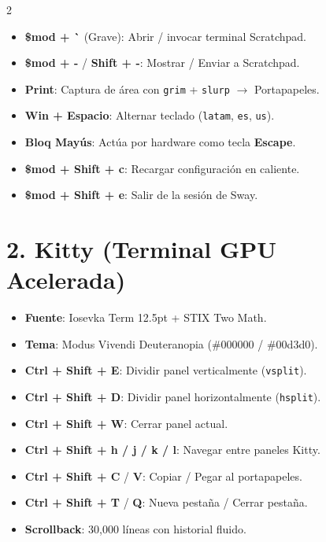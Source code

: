 \documentclass[article,spanish]{apuntes-scr}
\begin{document}
\begin{multicols*}{2}
\begin{itemize}[leftmargin=*]
    \item \textbf{\$mod + \`{}} (Grave): Abrir / invocar terminal Scratchpad.
    \item \textbf{\$mod + -} / \textbf{Shift + -}: Mostrar / Enviar a Scratchpad.
    \item \textbf{Print}: Captura de área con \texttt{grim} + \texttt{slurp} $\to$ Portapapeles.
    \item \textbf{Win + Espacio}: Alternar teclado (\texttt{latam}, \texttt{es}, \texttt{us}).
    \item \textbf{Bloq Mayús}: Actúa por hardware como tecla \textbf{Escape}.
    \item \textbf{\$mod + Shift + c}: Recargar configuración en caliente.
    \item \textbf{\$mod + Shift + e}: Salir de la sesión de Sway.
  \end{itemize}

  \section*{2. Kitty (Terminal GPU Acelerada)}
  \begin{itemize}[leftmargin=*]
    \item \textbf{Fuente}: Iosevka Term 12.5pt + STIX Two Math.
    \item \textbf{Tema}: Modus Vivendi Deuteranopia (\#000000 / \#00d3d0).
    \item \textbf{Ctrl + Shift + E}: Dividir panel verticalmente (\texttt{vsplit}).
    \item \textbf{Ctrl + Shift + D}: Dividir panel horizontalmente (\texttt{hsplit}).
    \item \textbf{Ctrl + Shift + W}: Cerrar panel actual.
    \item \textbf{Ctrl + Shift + h / j / k / l}: Navegar entre paneles Kitty.
    \item \textbf{Ctrl + Shift + C} / \textbf{V}: Copiar / Pegar al portapapeles.
    \item \textbf{Ctrl + Shift + T} / \textbf{Q}: Nueva pestaña / Cerrar pestaña.
    \item \textbf{Scrollback}: 30,000 líneas con historial fluido.
  \end{itemize}


\end{multicols*}
\end{document}
